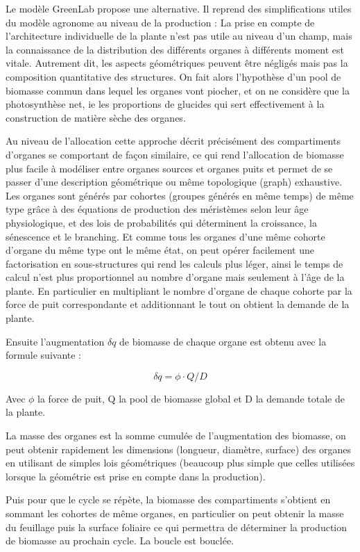 Le modèle GreenLab propose une alternative. Il reprend des simplifications utiles du modèle agronome au niveau de la production : La prise en compte de l’architecture individuelle de la plante n’est pas utile au niveau d’un champ, mais la connaissance de la distribution des différents organes à différents moment est vitale. Autrement dit, les aspects géométriques peuvent être négligés mais pas la composition quantitative des structures. On fait alors l’hypothèse d’un pool de biomasse commun dans lequel les organes vont piocher, et on ne considère que la photosynthèse net, ie les proportions de glucides qui sert effectivement à la construction de matière sèche des organes. 

Au niveau de l’allocation cette approche décrit précisément des compartiments d’organes se comportant de façon similaire, ce qui rend l’allocation de biomasse plus facile à modéliser entre organes sources et organes puits et permet de se passer d’une description géométrique ou même topologique (graph) exhaustive. Les organes sont générés par cohortes (groupes générés en même temps) de même type grâce à des équations de production des méristèmes selon leur âge physiologique, et des lois de probabilités qui déterminent la croissance, la sénescence et le branching. Et comme tous les organes d’une même cohorte d’organe du même type ont le même état, on peut opérer facilement une factorisation en sous-structures qui rend les calculs plus léger, ainsi le temps de calcul n’est plus proportionnel au nombre d’organe mais seulement à l’âge de la plante. En particulier en multipliant le nombre d’organe de chaque cohorte par la force de puit correspondante et additionnant le tout on obtient la demande de la plante.

Ensuite l’augmentation $\delta q$ de biomasse de chaque organe est obtenu avec la formule suivante :

\[ \delta q = \phi \cdot Q/D \]

Avec $\phi$ la force de puit, Q la pool de biomasse global et D la demande totale de la plante.

La masse des organes est la somme cumulée de l’augmentation des biomasse, on peut obtenir rapidement les dimensions (longueur, diamètre, surface) des organes en utilisant de simples lois géométriques (beaucoup plus simple que celles utilisées lorsque la géométrie est prise en compte dans la production). 

Puis pour que le cycle se répète, la biomasse des compartiments s’obtient  en sommant les cohortes de même organes, en particulier on peut obtenir la masse du feuillage puis la surface foliaire ce qui permettra de déterminer la production de biomasse au prochain cycle. La boucle est bouclée.

